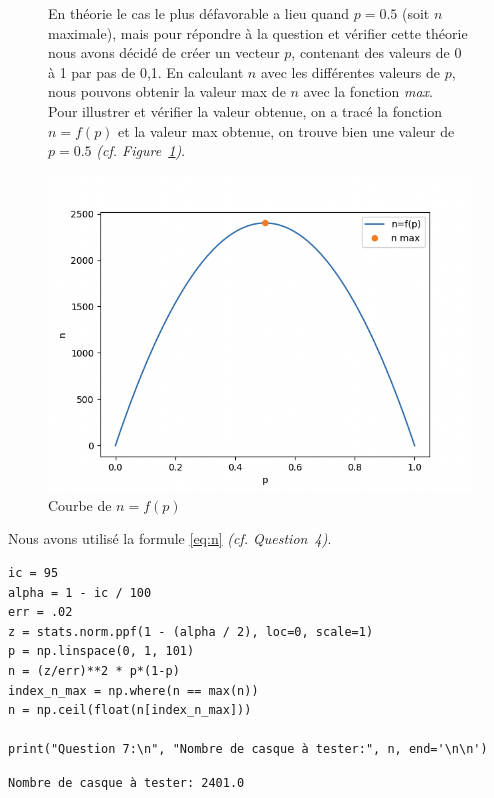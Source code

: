 \begin{figure}[!h]
    \centering
    \begin{minipage}{.48\linewidth}
        En théorie le cas le plus défavorable a lieu quand $p=0.5$ (soit $n$ maximale), mais pour répondre à la question et vérifier cette théorie nous avons décidé de créer un vecteur $p$, contenant des valeurs de 0 à 1 par pas de 0,1. En calculant $n$ avec les différentes valeurs de $p$, nous pouvons obtenir 
        la valeur max de $n$ avec la fonction \textit{max}. \\

        Pour illustrer et vérifier la valeur obtenue, on a tracé la fonction $n=f(p)$ et la valeur max obtenue, on trouve bien une valeur de $p=0.5$ \textit{(cf. Figure~\ref*{fig:figure1})}.
    \end{minipage}\hfill
    \begin{minipage}{.48\linewidth}
        \begin{center}
            \includegraphics[width=1\textwidth]{img/figure1.png}
            \caption{\label{fig:figure1}Courbe de $n=f(p)$}
        \end{center}
    \end{minipage}
\end{figure}

\noindent
Nous avons utilisé la formule \ref*{eq:n} \textit{(cf. Question~4)}.

\vspace{.2cm}


\begin{lstlisting}[style=myPython, caption=Code Python question 7, frame=lines]
ic = 95
alpha = 1 - ic / 100
err = .02
z = stats.norm.ppf(1 - (alpha / 2), loc=0, scale=1)
p = np.linspace(0, 1, 101)
n = (z/err)**2 * p*(1-p)
index_n_max = np.where(n == max(n))
n = np.ceil(float(n[index_n_max]))

print("Question 7:\n", "Nombre de casque à tester:", n, end='\n\n')
\end{lstlisting}

\begin{lstlisting}[style=myLog, caption=Résultat du code, frame=lines]
Nombre de casque à tester: 2401.0
\end{lstlisting}

